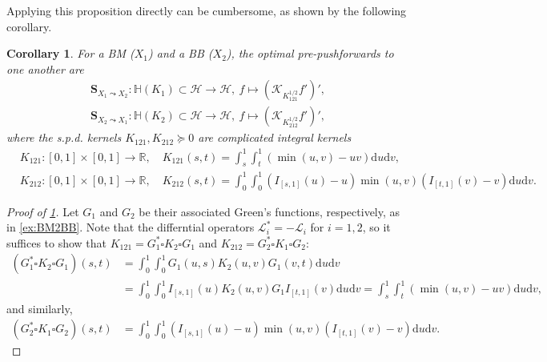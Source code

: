 \documentclass[noinfoline]{imsart}\setcounter{tocdepth}{2}
\renewcommand{\b}[1]{\mathbb{#1}} %
\newcommand{\m}[1]{\mathbf{#1}} %
\newcommand{\s}[1]{\mathscr{#1}} %
\renewcommand{\c}[1]{\mathcal{#1}} %
\newcommand{\rd}{\mathrm{d}} %
\theoremstyle{plain}
\newtheorem{corollary}[theorem]{Corollary}
\begin{document}
Applying this proposition directly can be cumbersome, as shown by the following corollary.
\begin{corollary}\label{cor:comp:Mercer}
For a BM ($X_{1}$) and a BB ($X_{2}$), the optimal pre-pushforwards to one another are
\begin{align*}
    \m{S}_{X_{1} \leadsto X_{2}}: \b{H}(K_{1}) \subset \c{H} \rightarrow \c{H}, \ f \mapsto \left( \s{K}_{K_{121}^{1/2}} f' \right)', \\
    \m{S}_{X_{2} \leadsto X_{1}}: \b{H}(K_{2}) \subset \c{H} \rightarrow \c{H}, \ f \mapsto \left( \s{K}_{K_{212}^{1/2}} f' \right)',
\end{align*}
where the s.p.d. kernels $K_{121}, K_{212} \succeq 0$ are complicated integral kernels
\begin{align*}
    &K_{121}:[0, 1] \times [0, 1] \rightarrow \b{R}, \quad K_{121}(s, t) = \int_{s}^{1} \int_{t}^{1} (\min(u, v) - uv) \rd u \rd v, \\
    &K_{212}:[0, 1] \times [0, 1] \rightarrow \b{R}, \quad K_{212}(s, t) = \int_{0}^{1} \int_{0}^{1} (I_{[s, 1]}(u) -u) \min (u, v) (I_{[t, 1]}(v) - v) \rd u \rd v.
\end{align*}
\end{corollary}


\begin{proof}[Proof of \cref{cor:comp:Mercer}]
Let $G_{1}$ and $G_{2}$ be their associated Green's functions, respectively, as in \cref{ex:BM2BB}. Note that the differntial operators $\s{L}_{i}^{*} = - \s{L}_{i}$ for $i=1, 2$, so it suffices to show that $K_{121} = G_{1}^{*} \square K_{2} \square G_{1}$ and $K_{212} = G_{2}^{*} \square K_{1} \square G_{2}$:
\begin{align*}
    (G_{1}^{*} \square K_{2} \square G_{1})(s, t) &= \int_{0}^{1} \int_{0}^{1} G_{1}(u, s) K_{2}(u, v) G_{1} (v, t) \rd u \rd v \\
    &= \int_{0}^{1} \int_{0}^{1} I_{[s, 1]}(u) K_{2}(u, v) G_{1} I_{[t, 1]}(v) \rd u \rd v 
    = \int_{s}^{1} \int_{t}^{1} (\min(u, v) - uv) \rd u \rd v,
\end{align*}
and similarly,
\begin{align*}
    (G_{2}^{*} \square K_{1} \square G_{2})(s, t) 
    &= \int_{0}^{1} \int_{0}^{1} (I_{[s, 1]}(u) -u) \min (u, v) (I_{[t, 1]}(v) - v) \rd u \rd v.
\end{align*}
\end{proof}
\end{document}
